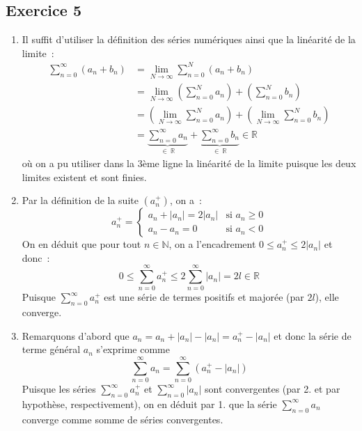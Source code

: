 \documentclass{article}
\begin{document}
\subsection{Exercice 5}
\begin{enumerate}
    \item Il suffit d'utiliser la définition des séries numériques ainsi que la linéarité de la limite~:
    \begin{align*}
    \sum_{n = 0}^{\infty} (a_n + b_n) & = \lim_{N \to \infty} \sum_{n = 0}^{N} (a_n + b_n) \\
    & = \lim_{N \to \infty} \left ( \sum_{n = 0}^{N} a_n \right ) + \left ( \sum_{n = 0}^{N} b_n \right ) \\
    & = \left ( \lim_{N \to \infty} \sum_{n = 0}^{N} a_n \right ) + \left ( \lim_{N \to \infty} \sum_{n = 0}^{N} b_n \right ) \\
    & = \underbrace{\sum_{n = 0}^{\infty} a_n}_{\in\ \mathbb{R}} + \underbrace{\sum_{n = 0}^{\infty} b_n}_{\in\ \mathbb{R}} \in \mathbb{R}
    \end{align*}
    où on a pu utiliser dans la 3ème ligne la linéarité de la limite puisque les deux limites existent et sont finies.
    
    \item Par la définition de la suite $(a_n^+)$, on a~:
    \[
    a_n^+ = \begin{cases}
    a_n + |a_n| = 2|a_n| & \textrm{si } a_n \geq 0 \\
    a_n - a_n = 0    & \textrm{si } a_n < 0
    \end{cases}
    \]
    On en déduit que pour tout $n \in \mathbb{N}$, on a l'encadrement $0 \leq a_n^+ \leq 2 |a_n|$ et donc~:
    \[
    0 \leq \sum_{n = 0}^{\infty} a_n^+ \leq 2 \sum_{n = 0}^{\infty} |a_n| = 2l \in \mathbb{R}
    \]
    Puisque $\displaystyle\sum_{n = 0}^{\infty} a_n^+$ est une série de termes positifs et majorée (par $2l$), elle converge.
    
    \item Remarquons d'abord que $a_n = a_n + |a_n| - |a_n| = a_n^+ - |a_n|$ et donc la série de terme général $a_n$ s'exprime comme
    \[
    \sum_{n = 0}^{\infty} a_n = \sum_{n = 0}^{\infty} \left ( a_n^+ - |a_n| \right )
    \]
    Puisque les séries $\displaystyle\sum_{n = 0}^{\infty} a_n^+$ et $\displaystyle\sum_{n = 0}^{\infty} |a_n|$ sont convergentes (par 2. et par hypothèse, respectivement), on en déduit par 1. que la série $\displaystyle\sum_{n = 0}^{\infty} a_n$ converge comme somme de séries convergentes.
\end{enumerate}
\end{document}
